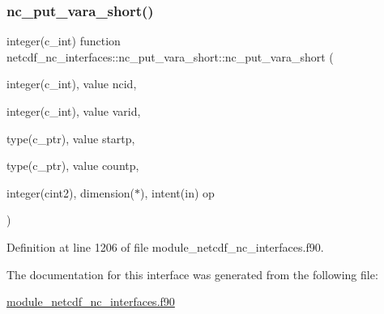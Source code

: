 \subsubsection{\texorpdfstring{nc\+\_\+put\+\_\+vara\+\_\+short()}{nc\_put\_vara\_short()}}
{\footnotesize\ttfamily integer(c\+\_\+int) function netcdf\+\_\+nc\+\_\+interfaces\+::nc\+\_\+put\+\_\+vara\+\_\+short\+::nc\+\_\+put\+\_\+vara\+\_\+short (\begin{DoxyParamCaption}\item[{integer(c\+\_\+int), value}]{ncid,  }\item[{integer(c\+\_\+int), value}]{varid,  }\item[{type(c\+\_\+ptr), value}]{startp,  }\item[{type(c\+\_\+ptr), value}]{countp,  }\item[{integer(cint2), dimension($\ast$), intent(in)}]{op }\end{DoxyParamCaption})}



Definition at line 1206 of file module\+\_\+netcdf\+\_\+nc\+\_\+interfaces.\+f90.



The documentation for this interface was generated from the following file\+:\begin{DoxyCompactItemize}
\item 
\hyperlink{module__netcdf__nc__interfaces_8f90}{module\+\_\+netcdf\+\_\+nc\+\_\+interfaces.\+f90}\end{DoxyCompactItemize}
